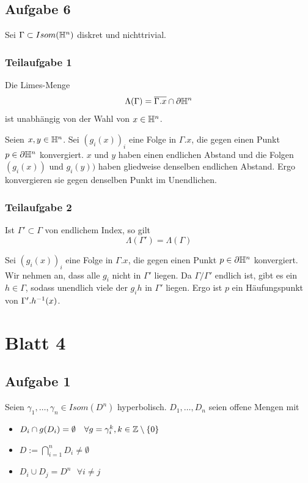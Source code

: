\documentclass{book}
\begin{document}
\subsection{Aufgabe 6}
Sei $\Gamma \subset Isom(\mathbb{H}^n)$ diskret und nichttrivial.
\subsubsection{Teilaufgabe 1}
Die Limes-Menge
\[ \Lambda(\Gamma) = \overline{\Gamma.x} \cap \partial \mathbb{H}^n \]
ist unabhängig von der Wahl von $x \in \mathbb{H}^n$.
\begin{Beweis}{}
	Seien $x,y \in \mathbb{H}^n$. Sei $(g_i(x))_i$ eine Folge in $\Gamma.x$, die gegen einen Punkt $p \in \partial \mathbb{H}^n$ konvergiert. $x$ und $y$ haben einen endlichen Abstand und die Folgen $(g_i(x))$ und $g_i(y))$ haben gliedweise denselben endlichen Abstand. Ergo konvergieren sie gegen denselben Punkt im Unendlichen.
\end{Beweis}

\subsubsection{Teilaufgabe 2}
Ist $\Gamma' \subset \Gamma$ von endlichem Index, so gilt
\[ \Lambda(\Gamma') = \Lambda(\Gamma) \]
\begin{Beweis}{}
	Sei $(g_i(x))_i$ eine Folge in $\Gamma.x$, die gegen einen Punkt $p \in \partial \mathbb{H}^n$ konvergiert. Wir nehmen an, dass alle $g_i$ nicht in $\Gamma'$ liegen. Da $\Gamma / \Gamma'$ endlich ist, gibt es ein $h \in \Gamma$, sodass unendlich viele der $g_ih$ in $\Gamma'$ liegen. Ergo ist $p$ ein Häufungspunkt von $\Gamma'.h^{-1}(x)$.
\end{Beweis}


\newpage
\section{Blatt 4}
\subsection{Aufgabe 1}
Seien $\gamma_1,\ldots, \gamma_n \in Isom(D^n)$ hyperbolisch. $D_1,\ldots, D_n$ seien offene Mengen mit
\begin{itemize}
	\item $D_i \cap g(D_i) = \emptyset ~~~\forall g = \gamma_i^k, k \in \mathbb{Z} \setminus\{0\}$
	\item $ D:= \bigcap_{i = 1}^n D_i \neq \emptyset $
	\item $D_i \cup D_j =D^n~~~\forall i \neq j$ 
\end{itemize}
\end{document}
